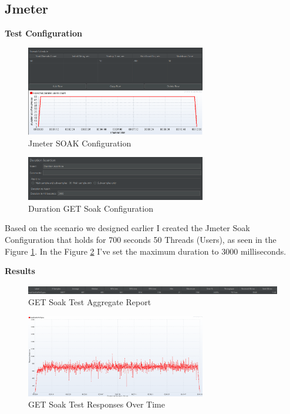 \documentclass[a4paper,11pt,openright,BCOR=15mm]{scrbook}
\begin{document}
		\subsection{Jmeter}
		\textbf{Test Configuration}
		\begin{figure}[H]
			\centering
			\includegraphics[width=0.7\textwidth]{figs/Performance/Test Configuration/JMETER-SOAK.png}
			\caption{Jmeter SOAK Configuration}
		 	\label{fig:JMETER-SOAK}
		\end{figure}
		\begin{figure}[H]
			\centering
			\includegraphics[width=0.7\textwidth]{figs/Performance/Test Configuration/Duration-SOAK-LOAD-JMETER.png}
			\caption{Duration GET Soak Configuration}
			\label{fig:DurationGetSoak}
		\end{figure}
		
		Based on the scenario we designed earlier I created the Jmeter Soak Configuration that holds for 700 seconds 50 Threads (Users), as seen in the Figure \ref{fig:JMETER-SOAK}. In the Figure \ref{fig:DurationGetSoak} I've set the maximum duration to 3000 milliseconds.

		\textbf{Results}
		
		\begin{figure}[H]
			\centering
			\includegraphics[width=\textwidth]{figs/Performance/Results/JMETER GET SOAK AR.png}
			\caption{GET Soak Test Aggregate Report}
			\label{fig:GETSoakAggregateReport}
		\end{figure}
		\begin{figure}[H]
			\centering
			\includegraphics[width=0.7\textwidth]{figs/Performance/Results/JMETER GET SOAK ROT.png}
			\caption{GET Soak Test Responses Over Time}
			\label{fig:GETSoakResposesOverTime}
		\end{figure}
		
\end{document}
